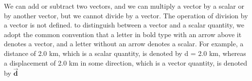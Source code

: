 \documentclass{report}
\begin{document}
    \bigbreak \noindent 
    We can add or subtract two vectors, and we can multiply a vector by a scalar or by another vector, but we cannot divide by a vector. The operation of division by a vector is not defined.
    \bigbreak \noindent 
    to distinguish between a vector and a scalar quantity, we adopt the common convention that a letter in bold type with an arrow above it denotes a vector, and a letter without an arrow denotes a scalar. For example, a distance of 2.0 km, which is a scalar quantity, is denoted by d = 2.0 km, whereas a displacement of 2.0 km in some direction, which is a vector quantity, is denoted by $\vec{\textbf{d}}$




    \pagebreak 

    \pagebreak 


    \pagebreak 
\end{document}

